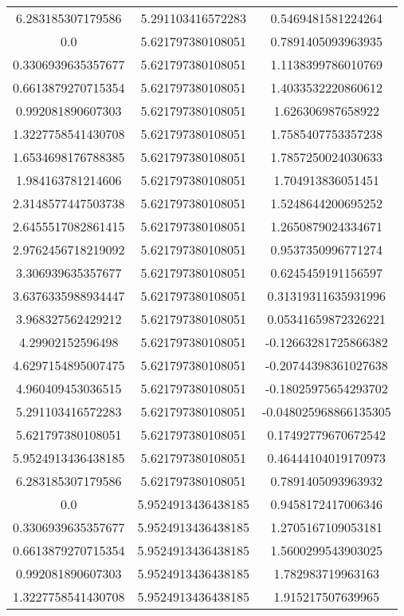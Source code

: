 \begin{table}
\begin{tabular}{ccc}
6.283185307179586 & 5.291103416572283 & 0.5469481581224264 \\
0.0 & 5.621797380108051 & 0.7891405093963935 \\
0.3306939635357677 & 5.621797380108051 & 1.1138399786010769 \\
0.6613879270715354 & 5.621797380108051 & 1.4033532220860612 \\
0.992081890607303 & 5.621797380108051 & 1.626306987658922 \\
1.3227758541430708 & 5.621797380108051 & 1.7585407753357238 \\
1.6534698176788385 & 5.621797380108051 & 1.7857250024030633 \\
1.984163781214606 & 5.621797380108051 & 1.704913836051451 \\
2.3148577447503738 & 5.621797380108051 & 1.5248644200695252 \\
2.6455517082861415 & 5.621797380108051 & 1.2650879024334671 \\
2.9762456718219092 & 5.621797380108051 & 0.9537350996771274 \\
3.306939635357677 & 5.621797380108051 & 0.6245459191156597 \\
3.6376335988934447 & 5.621797380108051 & 0.31319311635931996 \\
3.968327562429212 & 5.621797380108051 & 0.05341659872326221 \\
4.29902152596498 & 5.621797380108051 & -0.12663281725866382 \\
4.6297154895007475 & 5.621797380108051 & -0.20744398361027638 \\
4.960409453036515 & 5.621797380108051 & -0.18025975654293702 \\
5.291103416572283 & 5.621797380108051 & -0.048025968866135305 \\
5.621797380108051 & 5.621797380108051 & 0.17492779670672542 \\
5.9524913436438185 & 5.621797380108051 & 0.46444104019170973 \\
6.283185307179586 & 5.621797380108051 & 0.7891405093963932 \\
0.0 & 5.9524913436438185 & 0.9458172417006346 \\
0.3306939635357677 & 5.9524913436438185 & 1.2705167109053181 \\
0.6613879270715354 & 5.9524913436438185 & 1.5600299543903025 \\
0.992081890607303 & 5.9524913436438185 & 1.782983719963163 \\
1.3227758541430708 & 5.9524913436438185 & 1.915217507639965 \\

\end{tabular}
\end{table}
